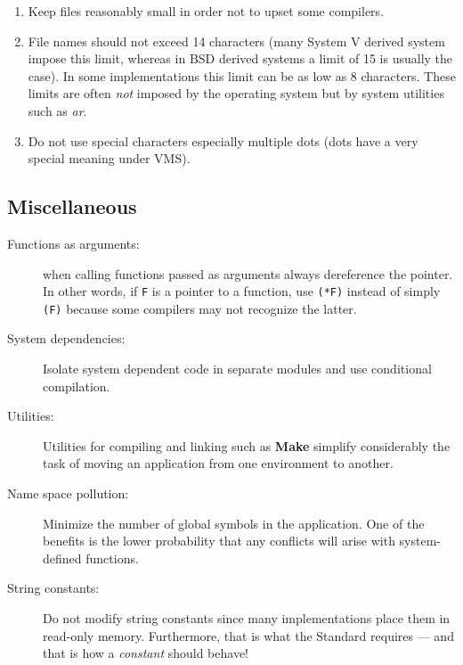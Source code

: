 \begin{enumerate}

\item Keep files reasonably small in order not to upset some compilers.

\item File names should not exceed 14 characters (many System V derived
 system impose this limit, whereas in BSD derived systems a limit
 of 15 is usually the case).
 In some implementations
 this limit can be as low as 8 characters.
These limits are often {\em not}
 imposed by the operating system but by system utilities such as {\em ar}.

\item Do not use special characters especially multiple dots (dots have
 a very special meaning under VMS).

\end{enumerate}

\subsection{Miscellaneous}
\begin{description}

\item[Functions as arguments:] when calling functions passed as arguments
 always dereference the pointer. In other words, if {\tt F} is a pointer
 to a function, use {\tt (*F)} instead of simply {\tt (F)} because some
 compilers may not recognize the latter.

\item[System dependencies:] Isolate system dependent code in separate modules
 and use conditional compilation.

\item[Utilities:] Utilities for compiling and linking such
 as {\bf Make} simplify considerably the task of moving an application from
 one environment to another.

\item[Name space pollution:] Minimize the number of global symbols in the
 application. One of the benefits is the lower probability that any
 conflicts will arise with system-defined functions.

\item[String constants:] Do not modify string constants since many
 implementations place them in read-only memory. Furthermore, that
 is what the Standard requires --- and that is how a {\em constant}
 should behave!

\end{description}

